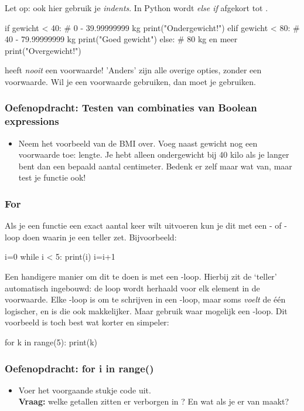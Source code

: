 \documentclass[a4paper,11pt, fleqn]{article}
\begin{document}
Let op: ook hier gebruik je \textit{indents}. In Python wordt \textit{else if} afgekort tot . 

\begin{python}
if gewicht < 40:            # 0 - 39.99999999 kg
    print("Ondergewicht!")
elif gewicht < 80:          # 40 - 79.99999999 kg
    print("Goed gewicht")
else:                       # 80 kg en meer
    print("Overgewicht!")
\end{python}

 heeft {\it nooit} een voorwaarde! 'Anders' zijn alle overige opties, zonder een voorwaarde. Wil je een voorwaarde gebruiken, dan moet je  gebruiken.


\subsubsection*{Oefenopdracht: Testen van combinaties van Boolean expressions} 
\begin{itemize}
	\item Neem het voorbeeld van de BMI over. Voeg naast gewicht nog een voorwaarde toe: lengte. Je hebt alleen ondergewicht bij 40 kilo als je langer bent dan een bepaald aantal centimeter. Bedenk er zelf maar wat van, maar test je functie ook!
\end{itemize}

\subsubsection{For}
Als je een functie een exact aantal keer wilt uitvoeren kun je dit met een - of -loop doen waarin je een teller zet. Bijvoorbeeld:
\begin{python}
i=0
while i < 5:
    print(i)
    i=i+1
\end{python}
Een handigere manier om dit te doen is met een -loop. Hierbij zit de `teller' automatisch ingebouwd: de loop wordt herhaald voor elk element in de voorwaarde. Elke -loop is om te schrijven in een -loop, maar soms \textit{voelt} de \'e\'en logischer, en is die ook makkelijker. Maar gebruik waar mogelijk een -loop. Dit voorbeeld is toch best wat korter en simpeler:

\begin{python}
for k in range(5):
    print(k)
\end{python}

\subsubsection*{Oefenopdracht: for i in range()}
\begin{itemize}
	\item Voer het voorgaande stukje code uit. \\
	\textbf{Vraag:} welke getallen zitten er verborgen in ? En wat als je er  van maakt?
\end{itemize}
\end{document}

